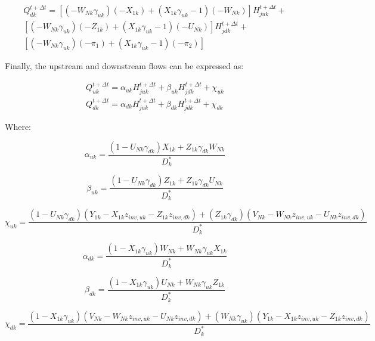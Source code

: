 \documentclass[11pt]{article}
\begin{document}
\begin{equation}
  \begin{split}
    Q_{dk}^{t + \Delta t} = 
    [(-W_{Nk} \gamma_{uk})(-X_{1k}) + (X_{1k} \gamma_{uk} - 1)(-W_{Nk})] H_{juk}^{t + \Delta t} + \\
    [(-W_{Nk} \gamma_{uk})(-Z_{1k}) + (X_{1k} \gamma_{uk} - 1)(-U_{Nk})] H_{jdk}^{t + \Delta t} + \\
    [(-W_{Nk} \gamma_{uk})(- \pi_1) + (X_{1k} \gamma_{uk} - 1)(-\pi_2)]
  \end{split}
\end{equation}

Finally, the upstream and downstream flows can be expressed as:

\begin{align}
 Q_{uk}^{t + \Delta t} = \alpha_{uk} H_{juk}^{t + \Delta t} + \beta_{uk} H_{jdk}^{t + \Delta t} + \chi_{uk} \\ 
 Q_{dk}^{t + \Delta t} = \alpha_{dk} H_{juk}^{t + \Delta t} + \beta_{dk} H_{jdk}^{t + \Delta t} + \chi_{dk} 
\end{align}

Where:

\begin{equation}
  \alpha_{uk} = \frac{(1 - U_{Nk} \gamma_{dk}) X_{1k} + Z_{1k} \gamma_{dk} W_{Nk}}{D_k^*}
\end{equation}

\begin{equation}
  \beta_{uk} = \frac{(1 - U_{Nk} \gamma_{dk}) Z_{1k} + Z_{1k} \gamma_{dk} U_{Nk}}{D_k^*}
\end{equation}

\begin{equation}
  \chi_{uk} = \frac{(1 - U_{Nk} \gamma_{dk})(Y_{1k} - X_{1k} z_{inv, uk} - Z_{1k} z_{inv, dk})  + (Z_{1k} \gamma_{dk})(V_{Nk} - W_{Nk} z_{inv, uk} - U_{Nk} z_{inv, dk})}{D_k^*}
\end{equation}

\begin{equation}
  \alpha_{dk} = \frac{(1 - X_{1k} \gamma_{uk}) W_{Nk} + W_{Nk} \gamma_{uk} X_{1k}}{D_k^*}
\end{equation}

\begin{equation}
  \beta_{dk} = \frac{(1 - X_{1k} \gamma_{uk}) U_{Nk} + W_{Nk} \gamma_{uk} Z_{1k}}{D_k^*}
\end{equation}

\begin{equation}
  \chi_{dk} = \frac{(1 - X_{1k} \gamma_{uk})(V_{Nk} - W_{Nk} z_{inv, uk} - U_{Nk} z_{inv, dk})  + (W_{Nk} \gamma_{uk})(Y_{1k} - X_{1k} z_{inv, uk} - Z_{1k} z_{inv, dk})}{D_k^*}
\end{equation}
\end{document}

